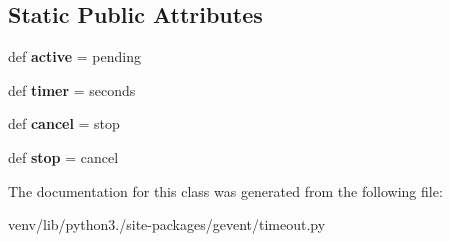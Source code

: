\subsection*{Static Public Attributes}
\begin{DoxyCompactItemize}
\item 
\mbox{\label{classgevent_1_1timeout_1_1___fake_timer_a80cfbc455fee34d7a57dd6d88ac56224}} 
def {\bfseries active} = pending
\item 
\mbox{\label{classgevent_1_1timeout_1_1___fake_timer_af762a6e397bad057cbcfd75ded26bf0c}} 
def {\bfseries timer} = seconds
\item 
\mbox{\label{classgevent_1_1timeout_1_1___fake_timer_a5cf4c3816da5a8a5d22361a93df6d1d5}} 
def {\bfseries cancel} = stop
\item 
\mbox{\label{classgevent_1_1timeout_1_1___fake_timer_a1ccd31771ae980554a7d839cb197c040}} 
def {\bfseries stop} = cancel
\end{DoxyCompactItemize}


The documentation for this class was generated from the following file\+:\begin{DoxyCompactItemize}
\item 
venv/lib/python3./site-\/packages/gevent/timeout.\+py\end{DoxyCompactItemize}
